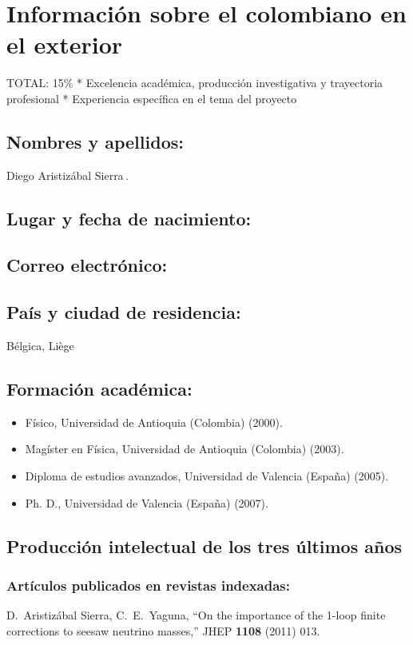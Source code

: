 \section{Información sobre el colombiano en el exterior}
\begin{evaluacion}
  TOTAL: 15\%
  * Excelencia académica, producción investigativa y trayectoria profesional
  * Experiencia específica en el tema del proyecto
\end{evaluacion}
\subsection{Nombres y apellidos:}
Diego Aristizábal Sierra\,.
\subsection{Lugar y fecha de nacimiento:}
\fnaristizabal
\subsection{Correo electrónico:}
\emaristizabal
\subsection{País y ciudad de residencia:}
Bélgica, Liège
\subsection{Formación académica:}
\begin{itemize}
\item Físico, Universidad de Antioquia (Colombia) (2000).
\item Magíster en Física, Universidad de Antioquia (Colombia) (2003).
\item Diploma de estudios avanzados, Universidad de Valencia (España) (2005).  
\item Ph. D., Universidad de Valencia (España) (2007).
\end{itemize}
\subsection{Producción intelectual de los tres últimos años}
\subsubsection{Artículos publicados en revistas indexadas:}
  D.~Aristizábal Sierra, C.~E.~Yaguna,
  ``On the importance of the 1-loop finite corrections to seesaw neutrino masses,''
  JHEP {\bf 1108 } (2011)  013.

